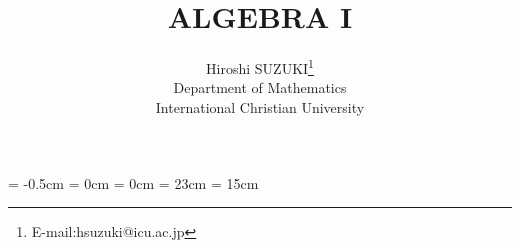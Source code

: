 
\topmargin = -0.5cm
\oddsidemargin = 0cm \evensidemargin = 0cm
\textheight = 23cm \textwidth = 15cm %

\renewcommand{\thepage}{%
	\arabic{section}--\arabic{page}}
\newcommand{\mysection}[1]{%
	\section{#1}\setcounter{page}{1}}

\title{ALGEBRA I}
      
\author{Hiroshi SUZUKI\thanks{E-mail:hsuzuki@icu.ac.jp}\\ 
        Department of Mathematics \\ 
        International Christian University}

\newtheorem{thm}{定理}[section]
\newtheorem{prop}[thm]{命題}
\newtheorem{lemma}[thm]{補題}
\newtheorem{cor}[thm]{系}
\newtheorem{exercise}{練習問題}[section]
\newtheorem{example}{例}[section]
\newtheorem{problem}{問題}[section]
\newtheorem{defin}{定義}[section]
\newenvironment{definition}{\begin{defin} \rm}{\end{defin}}
\newenvironment{ex}{\begin{exercise} \rm}{\end{exercise}}
\newenvironment{eg}{\begin{example} \rm}{\end{example}}
\newenvironment{prob}{\begin{problem} \rm}{\end{problem}}
\newcommand{\remarks}{\vspace{2ex}\noindent{\bf Remarks.\quad}}
\newcommand{\note}{\vspace{2ex}\noindent{\gt 注\quad}}
\newcommand{\proof}{{\gt 証明\quad}}
\newcommand{\qed}{\hfill\hbox{\rule{6pt}{6pt}}}
\newcommand{\bZ}{\mbox{\boldmath $Z$}}
\newcommand{\bN}{\mbox{\boldmath $N$}}
\newcommand{\bR}{\mbox{\boldmath $R$}}
\newcommand{\bC}{\mbox{\boldmath $C$}}
\newcommand{\bQ}{\mbox{\boldmath $Q$}}
\newcommand{\mat}{\mbox{{\rm Mat}}}
\newcommand{\gl}{\mbox{{\rm GL}}}
\renewcommand{\ker}{\mbox{{\rm Ker}}}
\newcommand{\im}{\mbox{{\rm Im}}}
\newcommand{\ch}{\mbox{{\rm char}}}
\newcommand{\aut}{\mbox{{\rm Aut}}}
\newcommand{\mod}{\mbox{{\rm mod}}}
\newcommand{\syl}{\mbox{{\rm Syl}}}



